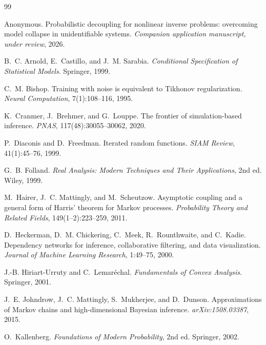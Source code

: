 \documentclass[11pt]{article}
\theoremstyle{plain}
\theoremstyle{definition}
\theoremstyle{remark}
\begin{document}
\begin{thebibliography}{99}

Anonymous.
Probabilistic decoupling for nonlinear inverse problems: overcoming model collapse in
unidentifiable systems.
\emph{Companion application manuscript, under review}, 2026.

B.~C. Arnold, E.~Castillo, and J.~M. Sarabia.
\emph{Conditional Specification of Statistical Models}. Springer, 1999.

C.~M. Bishop.
Training with noise is equivalent to Tikhonov regularization.
\emph{Neural Computation}, 7(1):108--116, 1995.

K.~Cranmer, J.~Brehmer, and G.~Louppe.
The frontier of simulation-based inference.
\emph{PNAS}, 117(48):30055--30062, 2020.

P.~Diaconis and D.~Freedman.
Iterated random functions.
\emph{SIAM Review}, 41(1):45--76, 1999.

G.~B. Folland.
\emph{Real Analysis: Modern Techniques and Their Applications}, 2nd ed. Wiley, 1999.

M.~Hairer, J.~C. Mattingly, and M.~Scheutzow.
Asymptotic coupling and a general form of Harris' theorem for Markov processes.
\emph{Probability Theory and Related Fields}, 149(1--2):223--259, 2011.

D.~Heckerman, D.~M. Chickering, C.~Meek, R.~Rounthwaite, and C.~Kadie.
Dependency networks for inference, collaborative filtering, and data visualization.
\emph{Journal of Machine Learning Research}, 1:49--75, 2000.

J.-B. Hiriart-Urruty and C.~Lemar\'echal.
\emph{Fundamentals of Convex Analysis}. Springer, 2001.

J.~E. Johndrow, J.~C. Mattingly, S.~Mukherjee, and D.~Dunson.
Approximations of Markov chains and high-dimensional Bayesian inference.
\emph{arXiv:1508.03387}, 2015.

O.~Kallenberg.
\emph{Foundations of Modern Probability}, 2nd ed. Springer, 2002.


\end{thebibliography}
\end{document}
